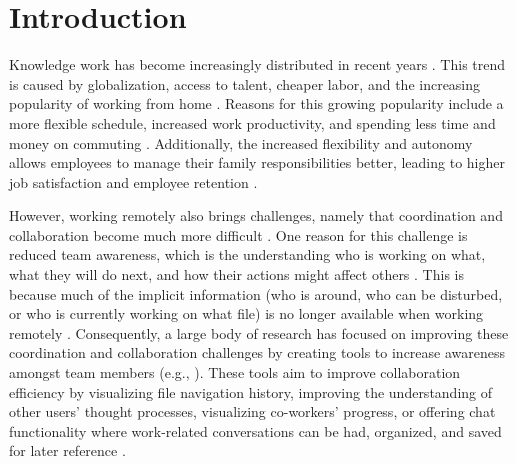 \chapter{Introduction}
\label{chapter:introduction}
Knowledge work has become increasingly distributed in recent years \autocite{herbsleb2001global}. This trend is caused by globalization, access to talent, cheaper labor,  and the increasing popularity of working from home \autocite{herbsleb2007global, ecoWorkingFromHome2021}. Reasons for this growing popularity include a more flexible schedule, increased work productivity, and spending less time and money on commuting \autocite{flores2019understanding, mulki2009set}. Additionally, the increased flexibility and autonomy allows employees to manage their family responsibilities better, leading to higher job satisfaction and employee retention \autocite{mulki2009set, gajendran2007good, madsen2011benefits}.

However, working remotely also brings challenges, namely that coordination and collaboration become much more difficult \autocite{herbsleb2007global}. One reason for this challenge is reduced team awareness, which is the understanding who is working on what, what they will do next, and how their actions might affect others \autocite{dourish1992awareness, herbsleb2007global, gutwin2004group}. %
This is because much of the implicit information (who is around, who can be disturbed, or who is currently working on what file) is no longer available when working remotely \autocite{gutwin2004importance}. Consequently, a large body of research has focused on improving these coordination and collaboration challenges by creating tools to increase awareness amongst team members (e.g., \autocite{biehl2007fastdash, jakobsen2009wipdash, cheng2003jazzing, deline2005easing}). These tools aim to improve collaboration efficiency by visualizing file navigation history, improving the understanding of other users' thought processes, visualizing co-workers' progress, or offering chat functionality where work-related conversations can be had, organized, and saved for later reference \autocite{biehl2007fastdash, jakobsen2009wipdash, cheng2003jazzing, deline2005easing}. 


